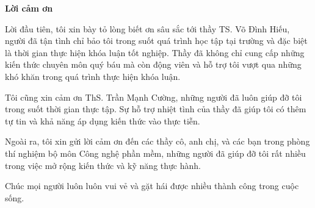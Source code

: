\begin{center}
\textbf{\large{Lời cảm ơn}	}
\end{center}

Lời đầu tiên, tôi xin bày tỏ lòng biết ơn sâu sắc tới thầy TS. Võ Đình Hiếu, người đã tận tình
chỉ bảo tôi trong suốt quá trình học tập tại trường và đặc biệt là thời gian thực hiện khóa luận tốt nghiệp. Thầy đã không chỉ cung cấp những kiến thức chuyên môn quý báu mà còn động viên và hỗ trợ tôi vượt qua những khó khăn trong quá trình thực hiện khóa luận.

Tôi cũng xin cảm ơn ThS. Trần Mạnh Cường, những người đã luôn giúp đỡ tôi trong suốt thời gian thực tập. Sự hỗ trợ nhiệt tình của thầy đã giúp tôi có thêm tự tin và khả năng áp dụng kiến thức vào thực tiễn.

Ngoài ra, tôi xin gửi lời cảm ơn đến các thầy cô, anh chị, và các bạn trong phòng thí nghiệm bộ môn Công nghệ phần mềm, những người đã giúp đỡ tôi rất nhiều trong việc mở rộng kiến thức và kỹ năng thực hành.

Chúc mọi người luôn luôn vui vẻ và gặt hái được nhiều thành công trong cuộc sống.

